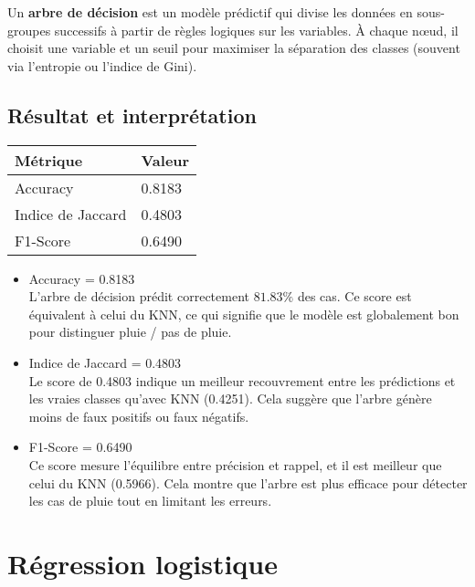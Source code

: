 \documentclass[a4paper,11pt]{article}
\begin{document}
	 Un \textbf{arbre de décision} est un modèle prédictif qui divise les données en sous-groupes successifs à partir de règles logiques sur les variables. À chaque nœud, il choisit une variable et un seuil pour maximiser la séparation des classes (souvent via l'entropie ou l'indice de Gini).
	\\
	\subsection{Résultat et interprétation}
	\begin{center}
		\begin{tabular}{|l|l|}
			\hline
			\textbf{Métrique} & \textbf{Valeur}  \\
			\hline
			Accuracy & 0.8183 \\
			\hline
			Indice de Jaccard & 0.4803 \\
			\hline
			F1-Score & 0.6490 \\
			\hline
		\end{tabular}
	\end{center}
	
	\begin{itemize}
		\item Accuracy = 0.8183 \\
		L’arbre de décision prédit correctement $81.83 \%$ des cas.
		Ce score est équivalent à celui du KNN, ce qui signifie que le modèle est globalement bon pour distinguer pluie / pas de pluie.
		
		\item  Indice de Jaccard = 0.4803\\
		Le score de 0.4803 indique  un meilleur recouvrement entre les prédictions et les vraies classes qu’avec KNN (0.4251).
		Cela suggère que l’arbre génère moins de faux positifs ou faux négatifs.
		
		
		\item  F1-Score = 0.6490 \\
		Ce score mesure l'équilibre entre précision et rappel, et il est meilleur que celui du KNN (0.5966).
		Cela montre que l’arbre est plus efficace pour détecter les cas de pluie tout en limitant les erreurs.
		
	\end{itemize}
	
	\newpage
	\vspace{1.5cm}
	\section{Régression logistique}
\end{document}
